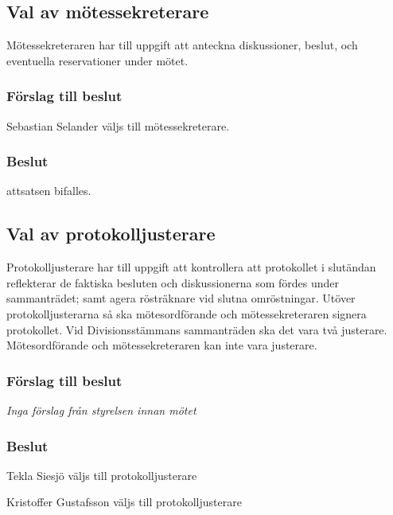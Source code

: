 \documentclass[protokoll]{dvd}
\begin{document}
\subsection{Val av mötessekreterare}

Mötessekreteraren har till uppgift att anteckna diskussioner, beslut, och eventuella reservationer under mötet.

\subsubsection*{Förslag till beslut}

\begin{attsatser}
	\item Sebastian Selander väljs till mötessekreterare.
\end{attsatser}

\subsubsection*{Beslut}

\begin{attsatser}
	\item attsatsen bifalles.
\end{attsatser}

\newpage

\subsection{Val av protokolljusterare}

Protokolljusterare har till uppgift att kontrollera att protokollet i slutändan reflekterar de faktiska besluten och diskussionerna som fördes under sammanträdet; samt agera rösträknare vid slutna omröstningar.
Utöver protokolljusterarna så ska mötesordförande och mötessekreteraren signera protokollet.
Vid Divisionsstämmans sammanträden ska det vara två justerare.
Mötesordförande och mötessekreteraren kan inte vara justerare.

\subsubsection*{Förslag till beslut}

\emph{Inga förslag från styrelsen innan mötet}

\subsubsection*{Beslut}
    \begin{attsatser}
        \item Tekla Siesjö väljs till protokolljusterare
        \item Kristoffer Gustafsson väljs till protokolljusterare
    \end{attsatser}
\end{document}
